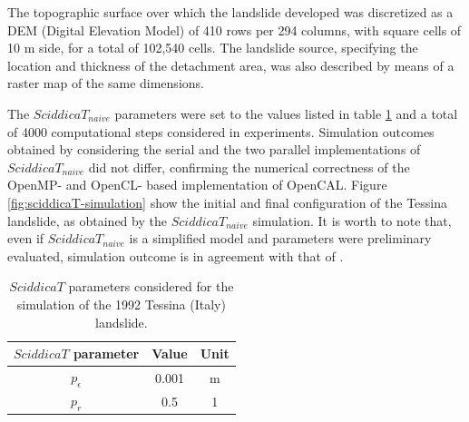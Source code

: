The topographic surface over which the landslide developed was
discretized as a DEM (Digital Elevation Model) of 410 rows per 294
columns, with square cells of 10 m side, for a total of 102,540
cells. The landslide source, specifying the location and thickness
of the detachment area, was also described by means of a raster map
of the same dimensions.

The $SciddicaT_{naive}$ parameters were set to the values listed in
table \ref{tab:sciddicaT-params} and a total of 4000 computational
steps considered in experiments. Simulation outcomes obtained by
considering the serial and the two parallel implementations of
$SciddicaT_{naive}$ did not differ, confirming the numerical
correctness of the OpenMP- and OpenCL- based implementation of
OpenCAL. Figure \ref{fig:sciddicaT-simulation} show the initial and
final configuration of the Tessina landslide, as obtained by the
$SciddicaT_{naive}$ simulation. It is worth to note that, even if
$SciddicaT_{naive}$ is a simplified model and parameters were
preliminary evaluated, simulation outcome is in agreement with that
of \citeauthor{avolio2000simulation}\cite{avolio2000simulation}.
\begin{table}
	\centering
	\begin{tabular}{ccc}
		\hline $SciddicaT$ parameter & Value & Unit \\ \hline
		$p_\epsilon$ & 0.001 & \si{m}\\ $p_r$ & 0.5 & 1\\ \hline
	\end{tabular}
	\caption{$SciddicaT$ parameters considered for the simulation of the 1992
		Tessina (Italy) landslide.}
	\label{tab:sciddicaT-params}
\end{table}

